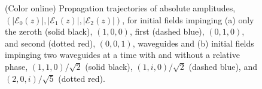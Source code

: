 \documentclass[9pt,twocolumn,twoside]{osajnl}
\begin{document}
\begin{figure}[htbp]
\centering
{}
\caption{(Color online) Propagation trajectories of absolute amplitudes, $(\vert \mathcal{E}_{0}(z) \vert, \vert \mathcal{E}_{1}(z) \vert, \vert \mathcal{E}_{2}(z) \vert )$, for initial fields impinging (a) only the zeroth (solid black), $(1,0,0)$, first (dashed blue), $(0,1,0)$, and second (dotted red), $(0,0,1)$, waveguides and (b) initial fields impinging two waveguides at a time with and without a relative phase, $(1,1,0)/ \sqrt{2}$ (solid black), $(1,i,0)/\sqrt{2}$ (dashed blue), and $(2,0,i)/\sqrt{5}$ (dotted red).}
\label{fig: Fig3}
\end{figure}
\end{document}
